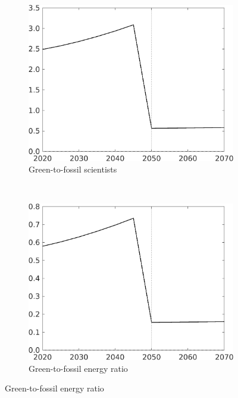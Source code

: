 \begin{figure}[h!!!]
	\begin{subfigure}{0.4\textwidth}
	\caption{Green-to-fossil scientists}
	\includegraphics[width=1\textwidth]{../../codding_model/own_basedOnFried/optimalPol_010922_revision/figures/all_13Sept22_Tplus30/sgsff_OPT_T_NoTaus_COMPtaulPer_regime4_spillover0_knspil1_noskill1_sep0_xgrowth0_PV1_etaa0.79.png}
\end{subfigure}
\begin{minipage}[]{0.1\textwidth}
	\
\end{minipage}
\begin{subfigure}{0.4\textwidth}
	\caption{Green-to-fossil energy ratio}
	\includegraphics[width=1\textwidth]{../../codding_model/own_basedOnFried/optimalPol_010922_revision/figures/all_13Sept22_Tplus30/GFF_OPT_T_NoTaus_COMPtaulPer_regime4_spillover0_knspil1_noskill1_sep0_xgrowth0_PV1_etaa0.79.png}
\end{subfigure}
\end{figure} 

